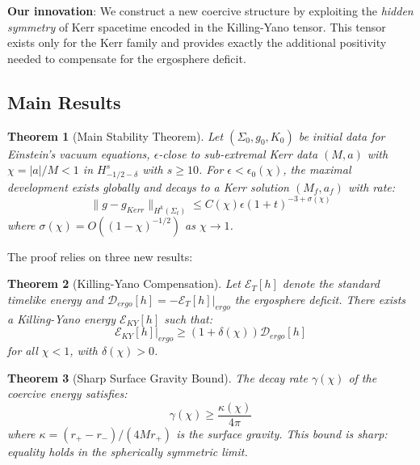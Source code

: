 \documentclass[12pt,a4paper]{article}
\newtheorem{theorem}{Theorem}[section]
\begin{document}
\textbf{Our innovation}: We construct a new coercive structure by exploiting the \emph{hidden symmetry} of Kerr spacetime encoded in the Killing-Yano tensor. This tensor exists only for the Kerr family and provides exactly the additional positivity needed to compensate for the ergosphere deficit.

\subsection{Main Results}

\begin{theorem}[Main Stability Theorem]\label{thm:main}
Let $(\Sigma_0, g_0, K_0)$ be initial data for Einstein's vacuum equations, $\epsilon$-close to sub-extremal Kerr data $(M, a)$ with $\chi = |a|/M < 1$ in $H^s_{-1/2-\delta}$ with $s \geq 10$. For $\epsilon < \epsilon_0(\chi)$, the maximal development exists globally and decays to a Kerr solution $(M_f, a_f)$ with rate:
\begin{equation}
\|g - g_{Kerr}\|_{H^k(\Sigma_t)} \leq C(\chi)\epsilon (1+t)^{-3 + \sigma(\chi)}
\end{equation}
where $\sigma(\chi) = O((1-\chi)^{-1/2})$ as $\chi \to 1$.
\end{theorem}

The proof relies on three new results:

\begin{theorem}[Killing-Yano Compensation]\label{thm:KY-compensation}
Let $\mathcal{E}_T[h]$ denote the standard timelike energy and $\mathcal{D}_{ergo}[h] = -\mathcal{E}_T[h]|_{ergo}$ the ergosphere deficit. There exists a Killing-Yano energy $\mathcal{E}_{KY}[h]$ such that:
\begin{equation}
\mathcal{E}_{KY}[h]|_{ergo} \geq (1 + \delta(\chi)) \mathcal{D}_{ergo}[h]
\end{equation}
for all $\chi < 1$, with $\delta(\chi) > 0$.
\end{theorem}

\begin{theorem}[Sharp Surface Gravity Bound]\label{thm:sharp-kappa}
The decay rate $\gamma(\chi)$ of the coercive energy satisfies:
\begin{equation}
\gamma(\chi) \geq \frac{\kappa(\chi)}{4\pi}
\end{equation}
where $\kappa = (r_+ - r_-)/(4Mr_+)$ is the surface gravity. This bound is sharp: equality holds in the spherically symmetric limit.
\end{theorem}
\end{document}
